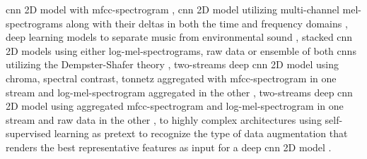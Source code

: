 \gls{cnn} 2D model with \gls{mfcc}-spectrogram \cite{Shreyas2020}, \gls{cnn} 2D model utilizing multi-channel mel-spectrograms along with their deltas in both the time and frequency domains \cite{Tang2018}, deep learning models to separate music from environmental sound \cite{Rothmund2018}, stacked \gls{cnn} 2D models using either log-mel-spectrograms, raw data or ensemble of both \gls{cnn}s utilizing the Dempster-Shafer theory \cite{Li2018}, two-streams deep \gls{cnn} 2D model using chroma, spectral contrast, tonnetz aggregated with \gls{mfcc}-spectrogram in one stream and log-mel-spectrogram aggregated in the other \cite{Su2019}, two-streams deep \gls{cnn} 2D model using aggregated \gls{mfcc}-spectrogram and log-mel-spectrogram in one stream and raw data in the other \cite{Tran2020}, to highly complex architectures using self-supervised learning as pretext to recognize the type of data augmentation that renders the best representative features as input for a deep \gls{cnn} 2D model \cite{Tripathi2021}.

